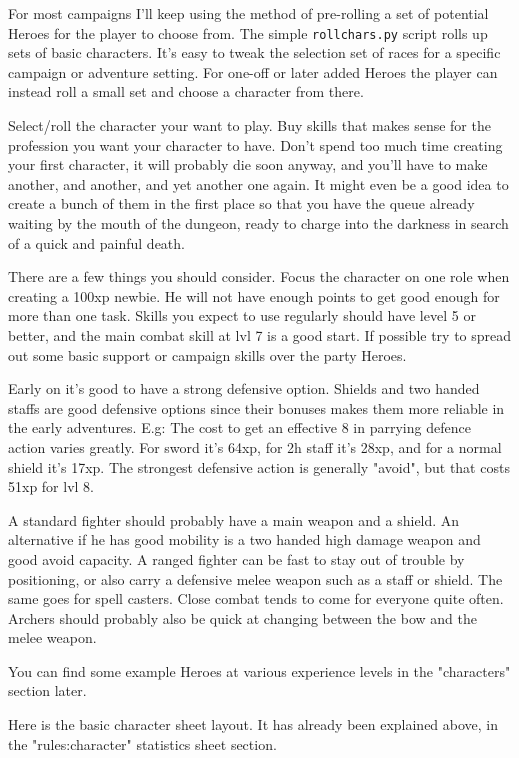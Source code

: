 For most campaigns I'll keep using the method of pre-rolling a set of potential Heroes for the player to choose from. The simple \verb|rollchars.py| script rolls up sets of basic characters. It's easy to tweak the selection set of races for a specific campaign or adventure setting.
For one-off or later added Heroes the player can instead roll a small set and choose a character from there.

Select/roll the character your want to play. Buy skills that makes sense for the profession you want your character to have. Don't spend too much time creating your first character, it will probably die soon anyway, and you'll have to make another, and another, and yet another one again. It might even be a good idea to create a bunch of them in the first place so that you have the queue already waiting by the mouth of the dungeon, ready to charge into the darkness in search of a quick and painful death.

There are a few things you should consider. Focus the character on one role when creating a 100xp newbie. He will not have enough points to get good enough for more than one task. Skills you expect to use regularly should have level 5 or better, and the main combat skill at lvl 7 is a good start. If possible try to spread out some basic support or campaign skills over the party Heroes.

Early on it's good to have a strong defensive option. Shields and two handed staffs are good defensive options since their bonuses makes them more reliable in the early adventures. E.g: The cost to get an effective 8 in parrying defence action varies greatly. For sword it's 64xp, for 2h staff it's 28xp, and for a normal shield it's 17xp. The strongest defensive action is generally "avoid", but that costs 51xp for lvl 8.

A standard fighter should probably have a main weapon and a shield. An alternative if he has good mobility is a two handed high damage weapon and good avoid capacity. A ranged fighter can be fast to stay out of trouble by positioning, or also carry a defensive melee weapon such as a staff or shield. The same goes for spell casters. Close combat tends to come for everyone quite often. Archers should probably also be quick at changing between the bow and the melee weapon.

You can find some example Heroes at various experience levels in the "characters" section later.

Here is the basic character sheet layout. It has already been explained above, in the "rules:character" statistics sheet section.

